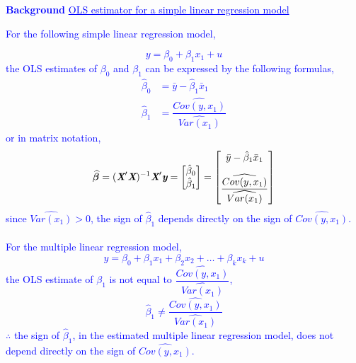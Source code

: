 \documentclass[12pt]{report}
\newenvironment{blueframed}[1][blue]
{\def\FrameCommand{\fboxsep=\FrameSep\fcolorbox{#1}{white}}%
\MakeFramed {\advance\hsize-\width \FrameRestore}}
{\endMakeFramed}
\begin{document}
\justify
\begin{blueframed}
	\textcolor{blue}{\textbf{Background}}
	\vspace{-\baselineskip}
	\justify
	\textcolor{blue}{\underline{OLS estimator for a simple linear regression model}}
	
	\noindent \textcolor{blue}
	{
		\noindent For the following simple linear regression model, 
}\end{blueframed}

\justify
\begin{blueframed}
	\noindent \textcolor{blue}
	{
		\noindent $$y = \beta_0 + \beta_1 x_1 + u$$  the OLS estimates of $\beta_0$ and $\beta_1$ can be expressed by the following formulas,
		\begin{align*}
		\hat{\beta}_0 &= \bar{y} - \hat{\beta}_1\bar{x}_1 \\
		\hat{\beta}_1 &= \dfrac{\widehat{Cov(y,x_1)}}{\widehat{Var(x_1)}}
		\end{align*}
		or in matrix notation, $$\widehat{\boldsymbol{\beta}} 
		= (\textit{\textbf{X}}'\textit{\textbf{X}})^{-1}\textit{\textbf{X}}'\textit{\textbf{y}}
		=
		\begin{bmatrix}
		\hat{\beta}_0 \\
		\hat{\beta}_1 
		\end{bmatrix}
		=
		\begin{bmatrix}
		\bar{y} - \hat{\beta}_1\bar{x}_1 \\[10pt]
		\dfrac{\widehat{Cov(y,x_1)}}{\widehat{Var(x_1)}} 
		\end{bmatrix}$$
		since $\widehat{Var(x_1)}>0$, the sign of $\hat{\beta}_1$ depends directly on the sign of $\widehat{Cov(y,x_1)}$. \\ \\ For the multiple linear regression model, $$y = \beta_0 + \beta_1 x_1 + \beta_2 x_2 + \dots + \beta_k x_k + u$$ the OLS estimate of $\beta_1$ is not equal to $\dfrac{\widehat{Cov(y,x_1)}}{\widehat{Var(x_1)}}$, $$\hat{\beta}_1 \neq \dfrac{\widehat{Cov(y,x_1)}}{\widehat{Var(x_1)}}$$ $\therefore$ the sign of $\hat{\beta}_1$, in the estimated multiple linear regression model, does not depend directly on the sign of $\widehat{Cov(y,x_1)}$.
}\end{blueframed}
\end{document}
